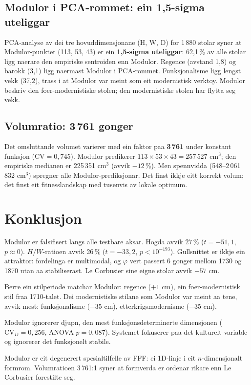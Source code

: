 \documentclass[10pt, a4paper, twocolumn]{article}
\begin{document}
\subsection{Modulor i PCA-rommet: ein 1,5-sigma uteliggar}

PCA-analyse av dei tre hovuddimensjonane (H, W, D) for 1\,880 stolar syner at Modulor-punktet (113, 53, 43) er ein \textbf{1,5-sigma uteliggar}: 62,1\,\% av alle stolar ligg naerare den empiriske sentroiden enn Modulor. Regence (avstand 1,8) og barokk (3,1) ligg naermast Modulor i PCA-rommet. Funksjonalisme ligg lengst vekk (37,2), trass i at Modulor var meint som eit modernistisk verktoy. Modulor beskriv den foer-modernistiske stolen; den modernistiske stolen har flytta seg vekk.

\subsection{Volumratio: 3\,761 gonger}

Det omsluttande volumet varierer med ein faktor paa \textbf{3\,761} under konstant funksjon ($\text{CV} = 0{,}745$). Modulor predikerer $113 \times 53 \times 43 = 257\,527$ cm$^3$; den empiriske medianen er 225\,351 cm$^3$ (avvik $-12$\,\%). Men spennvidda (548--2\,061\,832 cm$^3$) spregner alle Modulor-prediksjonar. Det finst ikkje eitt korrekt volum; det finst eit fitnesslandskap med tusenvis av lokale optimum.


\section{Konklusjon}

Modulor er falsifisert langs alle testbare aksar. Hogda avvik 27\,\% ($t = -51{,}1$, $p \approx 0$). $H/W$-ratioen avvik 26\,\% ($t = -33{,}2$, $p < 10^{-193}$). Gullsnittet er ikkje ein attraktor: fordelinga er multimodal, og $\varphi$ vert passert 6 gonger mellom 1730 og 1870 utan aa stabiliserast. Le Corbusier sine eigne stolar avvik $-57$ cm.

Berre ein stilperiode matchar Modulor: regence ($+1$ cm), ein foer-modernistisk stil fraa 1710-talet. Dei modernistiske stilane som Modulor var meint aa tene, avvik mest: funksjonalisme ($-35$ cm), etterkrigsmodernisme ($-35$ cm).

Modulor ignorerer djupn, den mest funksjonsdeterminerte dimensjonen ($\text{CV}_D = 0{,}256$, ANOVA $p = 0{,}087$). Systemet fokuserer paa det kulturelt variable og ignorerer det funksjonelt stabile.

Modulor er eit degenerert spesialtilfelle av FFF: ei 1D-linje i eit $n$-dimensjonalt formrom. Volumratioen 3\,761:1 syner at formverda er ordenar rikare enn Le Corbusier forestilte seg.

\newpage
\onecolumn


\end{document}
